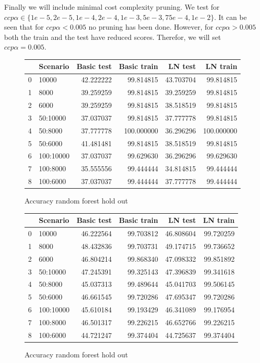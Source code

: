 \documentclass[11pt]{article}
\begin{document}
Finally we will include minimal cost complexity pruning. We test for $ccp  \alpha \in \{1e-5, 2e-5, 1e-4, 2e-4, 1e-3, 5e-3, 75e-4, 1e-2\}$. It can be seen that for $ccp \alpha < 0.005$ no pruning has been done. However, for $ccp \alpha > 0.005$ both the train and the test have reduced scores. Therefor, we will set $ccp \alpha=0.005$.   
%
\newline
\begin{figure}
\begin{tabular}{llrrrr}
\toprule
{} &   Scenario &  Basic test &  Basic train &    LN test &    LN train \\
\midrule
0 &      10000 &   42.222222 &    99.814815 &  43.703704 &   99.814815 \\
1 &       8000 &   39.259259 &    99.814815 &  39.259259 &   99.814815 \\
2 &       6000 &   39.259259 &    99.814815 &  38.518519 &   99.814815 \\
3 &   50:10000 &   37.037037 &    99.814815 &  37.777778 &   99.814815 \\
4 &    50:8000 &   37.777778 &   100.000000 &  36.296296 &  100.000000 \\
5 &    50:6000 &   41.481481 &    99.814815 &  38.518519 &   99.814815 \\
6 &  100:10000 &   37.037037 &    99.629630 &  36.296296 &   99.629630 \\
7 &   100:8000 &   35.555556 &    99.444444 &  34.814815 &   99.444444 \\
8 &   100:6000 &   37.037037 &    99.444444 &  37.777778 &   99.444444 \\
\bottomrule
\end{tabular}
\caption{Accuracy random forest hold out}
\label{Fig::Accuracy random forest hold out}
\end{figure}
%
\begin{figure}
\begin{tabular}{llrrrr}
\toprule
{} &   Scenario &  Basic test &  Basic train &    LN test &   LN train \\
\midrule
0 &      10000 &   46.222564 &    99.703812 &  46.808604 &  99.720259 \\
1 &       8000 &   48.432836 &    99.703731 &  49.174715 &  99.736652 \\
2 &       6000 &   46.804214 &    99.868340 &  47.098332 &  99.851892 \\
3 &   50:10000 &   47.245391 &    99.325143 &  47.396839 &  99.341618 \\
4 &    50:8000 &   45.037313 &    99.489644 &  45.041703 &  99.506145 \\
5 &    50:6000 &   46.661545 &    99.720286 &  47.695347 &  99.720286 \\
6 &  100:10000 &   45.610184 &    99.193429 &  46.341089 &  99.176954 \\
7 &   100:8000 &   46.501317 &    99.226215 &  46.652766 &  99.226215 \\
8 &   100:6000 &   44.721247 &    99.374404 &  44.725637 &  99.374404 \\
\bottomrule
\end{tabular}
\caption{Accuracy random forest hold out}
\label{Fig::Accuracy random forest hold out}
\end{figure}
\end{document}
